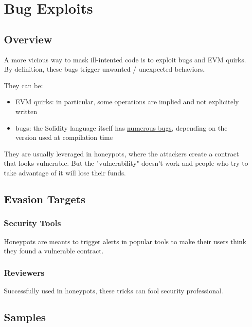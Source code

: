 \section{Bug Exploits}

\subsection{Overview}

A more vicious way to mask ill-intented code is to exploit bugs and EVM quirks.
By definition, these bugs trigger unwanted / unexpected behaviors.

They can be:

\begin{itemize}
\item{EVM quirks: in particular, some operations are implied and not explicitely written}
\item{bugs: the Solidity language itself has \href{https://github.com/ethereum/solidity/blob/develop/docs/bugs.json}{numerous bugs}, depending on the version used at compilation time \cite{changelog-solidity-bugs}}
\end{itemize}

They are usually leveraged in honeypots, where the attackers create a contract that looks vulnerable.
But the "vulnerability" doesn't work and people who try to take advantage of it will lose their funds.

\subsection{Evasion Targets}

\subsubsection{Security Tools}

Honeypots are meants to trigger alerts in popular tools to make their users think they found a vulnerable contract.

\subsubsection{Reviewers}

Successfully used in honeypots, these tricks can fool security professional.

\subsection{Samples}

